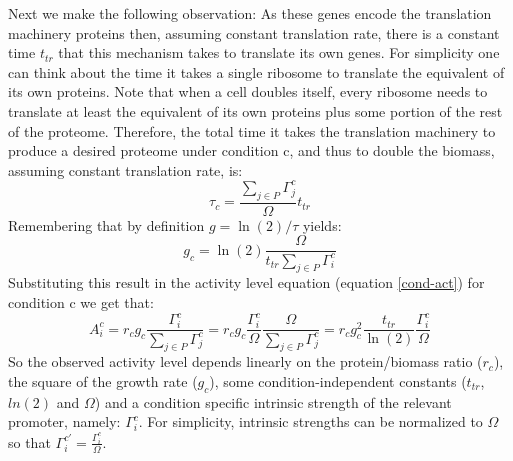 \documentclass[a4page,notitlepage]{article}
\begin{document}
Next we make the following observation:
As these genes encode the translation machinery proteins then, assuming constant translation rate, there is a constant time $t_{tr}$ that this mechanism takes to translate its own genes.
For simplicity one can think about the time it takes a single ribosome to translate the equivalent of its own proteins.
Note that when a cell doubles itself, every ribosome needs to translate at least the equivalent of its own proteins plus some portion of the rest of the proteome.
Therefore, the total time it takes the translation machinery to produce a desired proteome under condition c, and thus to double the biomass, assuming constant translation rate, is:
\[\tau_c=\frac{\sum_{j\in P}\Gamma^c_j}{\Omega}t_{tr}\]
Remembering that by  definition $g=\ln(2)/\tau$ yields:
\[g_c=\ln(2)\frac{\Omega}{t_{tr}\sum_{j\in P}\Gamma^c_i}\]
Substituting this result in the activity level equation (equation \ref{cond-act}) for condition c we get that:
\begin{equation}
\label{ind-act}
A^c_i=r_c g_c \frac{\Gamma^c_i}{\sum_{j\in P}\Gamma^c_j}=r_c g_c \frac{\Gamma^c_i}{\Omega}\frac{\Omega}{\sum_{j\in P}\Gamma^c_j}=r_c g_c^2\frac{t_{tr}}{\ln(2)}\frac{\Gamma^c_i}{\Omega}
\end{equation}
So the observed activity level depends linearly on the protein/biomass ratio ($r_c$), the square of the growth rate ($g_c$), some condition-independent constants ($t_{tr}$, $ln(2)$ and $\Omega$) and a condition specific intrinsic strength of the relevant promoter, namely: ${\Gamma^c_i}$.
For simplicity, intrinsic strengths can be normalized to $\Omega$ so that $\Gamma_i^{c'} = \frac{\Gamma^c_i}{\Omega}$.
\end{document}
